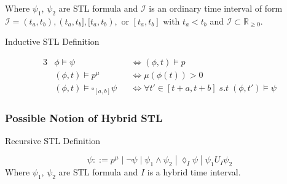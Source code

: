\documentclass{article}
\theoremstyle{definition}
\newtheorem{definition}{Definition}[section]
\begin{document}
Where $\psi_1$, $\psi_2$ are STL formula and $\mathcal{I}$ is an ordinary time interval of form $\mathcal{I} = (t_a,t_b),(t_a,t_b],[t_a,t_b),$ or $[t_a,t_b]$ with $t_a < t_b$ and $\mathcal{I} \subset \mathbb{R}_{\geq 0}$.

\begin{center}
    Inductive STL Definition
\end{center}
\begin{alignat*}{3}
            &\phi \models \psi &&\Leftrightarrow (\phi, t) \models p \\
            &(\phi, t) \models p^\mu \quad &&\Leftrightarrow \mu(\phi(t))
> 0\\
            &(\phi, t) \models \square_{[a,b]} \psi &&\Leftrightarrow
\forall t' \in [t + a, t + b]\;s.t\;(\phi, t') \models \psi
\end{alignat*}

\clearpage


\subsubsection{Possible Notion of Hybrid STL}
\begin{center}
    Recursive STL Definition
\end{center}
\begin{equation}
    \psi ::= p^\mu\;|\;\lnot \psi\;|\;\psi_1 \land \psi_2\;|\;\lozenge_{I} \psi\;|\;\psi_1 U_{I} \psi_2
\end{equation}
Where $\psi_1$, $\psi_2$ are STL formula and $I$ is a hybrid time interval.
\end{document}
